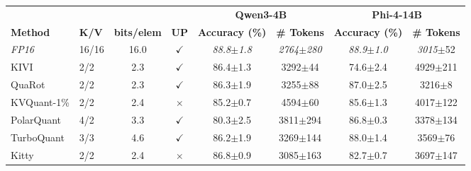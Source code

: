 \documentclass{llmxive}
\providecommand{\others}[1]{\cellcolor{gray!10}#1}
\begin{document}
\begin{table}[t]
\centering
\begin{threeparttable}
\small
\setlength{\tabcolsep}{6pt}
\begin{tabular}{l l c c c c c c}
\toprule
& & & & \multicolumn{2}{c}{\textbf{Qwen3-4B}} & \multicolumn{2}{c}{\textbf{Phi-4-14B}} \\
\cmidrule(lr){5-6} \cmidrule(lr){7-8}
\textbf{Method} 
& \textbf{K/V} 
& \textbf{bits/elem}
& \textbf{UP}
& \textbf{Accuracy (\%)} & \textbf{\# Tokens}
& \textbf{Accuracy (\%)} & \textbf{\# Tokens} \\
\midrule

\textit{FP16} 
& 16/16 & 16.0 & $\checkmark$
& \textit{88.8\tiny$\pm$1.8} & \textit{\num{2764}\tiny$\pm$280}
& \textit{88.9\tiny$\pm$1.0} & \textit{\num{3015}}\tiny$\pm$52 \\
\cmidrule(lr){1-8}

\others{KIVI}       
& \others{2/2} & \others{2.3} & \others{$\checkmark$}
& \others{86.4\tiny$\pm$1.3} & \others{\num{3292}\tiny$\pm$44}
& \others{74.6\tiny$\pm$2.4} & \others{\num{4929}\tiny$\pm$211} \\

\others{QuaRot}     
& \others{2/2} & \others{2.3} & \others{$\checkmark$}
& \others{86.3\tiny$\pm$1.9} & \others{\num{3255}\tiny$\pm$88}
& \others{87.0\tiny$\pm$2.5} & \others{\num{3216}\tiny$\pm$8} \\

\others{KVQuant-1\%}    
& \others{2/2} & \others{2.4} & \others{$\times$}
& \others{85.2\tiny$\pm$0.7} & \others{\num{4594}\tiny$\pm$60}
& \others{85.6\tiny$\pm$1.3} & \others{\num{4017}\tiny$\pm$122} \\

\others{PolarQuant} 
& \others{4/2} & \others{3.3} & \others{$\checkmark$}
& \others{80.3\tiny$\pm$2.5} & \others{\num{3811}\tiny$\pm$294}
& \others{86.8\tiny$\pm$0.3} & \others{\num{3378}\tiny$\pm$134} \\

\others{TurboQuant\tnote{1}} 
& \others{3/3} & \others{4.6} & \others{$\checkmark$}
& \others{86.2\tiny$\pm$1.9} & \others{\num{3269}\tiny$\pm$144}
& \others{88.0\tiny$\pm$1.4} & \others{\num{3569}\tiny$\pm$76} \\

\others{Kitty} & \others{2/2} & \others{2.4} & \others{$\times$} 
& \others{86.8\tiny$\pm$0.9} & \others{\num{3085}\tiny$\pm$163} 
& \others{82.7\tiny$\pm$0.7} & \others{\num{3697}\tiny$\pm$147} \\


\end{tabular}
\end{threeparttable}
\end{table}
\end{document}
